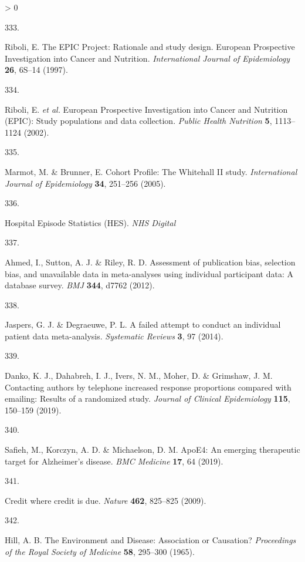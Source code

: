 \documentclass[a4paper, twoside]{templates/ociamthesis}
\newlength{\cslhangindent}
\newlength{\csllabelwidth}
\newenvironment{CSLReferences}[3] %
 {%
  \setlength{\parindent}{0pt}
  \ifodd #1 \everypar{\setlength{\hangindent}{\cslhangindent}}\ignorespaces\fi
  \ifnum #2 > 0
  \setlength{\parskip}{#2\baselineskip}
  \fi
 }%
 {}
\newcommand{\CSLLeftMargin}[1]{\parbox[t]{\maxof{\widthof{#1}}{\csllabelwidth}}{#1}}
\newcommand{\CSLRightInline}[1]{\parbox[t]{\linewidth - \csllabelwidth}{#1}}
\begin{document}
\begin{CSLReferences}{0}{0}
\leavevmode\hypertarget{ref-riboli1997}{}%
\CSLLeftMargin{333. }
\CSLRightInline{Riboli, E. The {EPIC Project}: Rationale and study design. {European Prospective Investigation} into {Cancer} and {Nutrition}. \emph{International Journal of Epidemiology} \textbf{26}, 6S--14 (1997).}

\leavevmode\hypertarget{ref-riboli2002}{}%
\CSLLeftMargin{334. }
\CSLRightInline{Riboli, E. \emph{et al.} European {Prospective Investigation} into {Cancer} and {Nutrition} ({EPIC}): Study populations and data collection. \emph{Public Health Nutrition} \textbf{5}, 1113--1124 (2002).}

\leavevmode\hypertarget{ref-marmot2005}{}%
\CSLLeftMargin{335. }
\CSLRightInline{Marmot, M. \& Brunner, E. Cohort {Profile}: The {Whitehall II} study. \emph{International Journal of Epidemiology} \textbf{34}, 251--256 (2005).}

\leavevmode\hypertarget{ref-zotero-15403}{}%
\CSLLeftMargin{336. }
\CSLRightInline{Hospital {Episode Statistics} ({HES}). \emph{NHS Digital}}

\leavevmode\hypertarget{ref-ahmed2012}{}%
\CSLLeftMargin{337. }
\CSLRightInline{Ahmed, I., Sutton, A. J. \& Riley, R. D. Assessment of publication bias, selection bias, and unavailable data in meta-analyses using individual participant data: A database survey. \emph{BMJ} \textbf{344}, d7762 (2012).}

\leavevmode\hypertarget{ref-jaspers2014}{}%
\CSLLeftMargin{338. }
\CSLRightInline{Jaspers, G. J. \& Degraeuwe, P. L. A failed attempt to conduct an individual patient data meta-analysis. \emph{Systematic Reviews} \textbf{3}, 97 (2014).}

\leavevmode\hypertarget{ref-danko2019}{}%
\CSLLeftMargin{339. }
\CSLRightInline{Danko, K. J., Dahabreh, I. J., Ivers, N. M., Moher, D. \& Grimshaw, J. M. Contacting authors by telephone increased response proportions compared with emailing: Results of a randomized study. \emph{Journal of Clinical Epidemiology} \textbf{115}, 150--159 (2019).}

\leavevmode\hypertarget{ref-safieh2019}{}%
\CSLLeftMargin{340. }
\CSLRightInline{Safieh, M., Korczyn, A. D. \& Michaelson, D. M. {ApoE4}: An emerging therapeutic target for {Alzheimer}'s disease. \emph{BMC Medicine} \textbf{17}, 64 (2019).}

\leavevmode\hypertarget{ref-nature2009}{}%
\CSLLeftMargin{341. }
\CSLRightInline{Credit where credit is due. \emph{Nature} \textbf{462}, 825--825 (2009).}

\leavevmode\hypertarget{ref-hill1965}{}%
\CSLLeftMargin{342. }
\CSLRightInline{Hill, A. B. The {Environment} and {Disease}: Association or {Causation}? \emph{Proceedings of the Royal Society of Medicine} \textbf{58}, 295--300 (1965).}


\end{CSLReferences}
\end{document}
